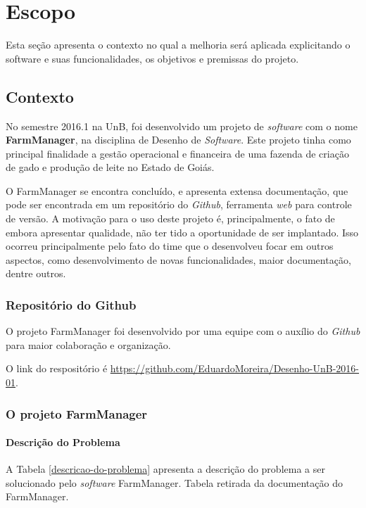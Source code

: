 \chapter[Escopo]{Escopo}

Esta seção apresenta o contexto no qual a melhoria será aplicada explicitando o software e suas funcionalidades, os objetivos e premissas do projeto.

\section{Contexto}

No semestre 2016.1 na UnB, foi desenvolvido um projeto de \textit{software} com o nome \textbf{FarmManager}, na disciplina de Desenho de \textit{Software}. Este projeto tinha como principal finalidade a gestão operacional e financeira de uma fazenda de criação de gado e produção de leite no Estado de Goiás.

O FarmManager se encontra concluído, e apresenta extensa documentação, que pode ser encontrada em um repositório do \textit{Github}, ferramenta \textit{web} para controle de versão. A motivação para o uso deste projeto é, principalmente, o fato de embora apresentar qualidade, não ter tido a oportunidade de ser implantado. Isso ocorreu principalmente pelo fato do time que o desenvolveu focar em outros aspectos, como desenvolvimento de novas funcionalidades, maior documentação, dentre outros.

\subsection{Repositório do Github}

O projeto FarmManager foi desenvolvido por uma equipe com o auxílio do \textit{Github} para maior colaboração e organização.

O link do respositório é \url{https://github.com/EduardoMoreira/Desenho-UnB-2016-01}.

\subsection{O projeto FarmManager}

\subsubsection{Descrição do Problema}

A Tabela \ref{descricao-do-problema} apresenta a descrição do problema a ser solucionado pelo \textit{software} FarmManager. Tabela retirada da documentação do FarmManager.


